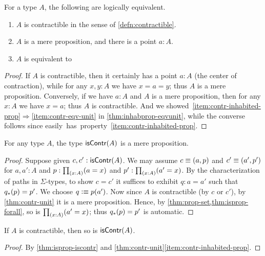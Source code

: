 \begin{lem}\label{thm:contr-unit}
  For a type $A$, the following are logically equivalent.
  \begin{enumerate}
  \item $A$ is contractible in the sense of \autoref{defn:contractible}.\label{item:contr}
  \item $A$ is a mere proposition, and there is a point $a:A$.\label{item:contr-inhabited-prop}
  \item $A$ is equivalent to \unit.\label{item:contr-eqv-unit}
  \end{enumerate}
\end{lem}
\begin{proof}
  If $A$ is contractible, then it certainly has a point $a:A$ (the center of contraction), while for any $x,y:A$ we have $x=a=y$; thus $A$ is a mere proposition.
  Conversely, if we have $a:A$ and $A$ is a mere proposition, then for any $x:A$ we have $x=a$; thus $A$ is contractible.
  And we showed~\ref{item:contr-inhabited-prop}$\Rightarrow$\ref{item:contr-eqv-unit} in \autoref{thm:inhabprop-eqvunit}, while the converse follows since \unit easily has property~\ref{item:contr-inhabited-prop}.
\end{proof}

\begin{lem}\label{thm:isprop-iscontr}
  For any type $A$, the type $\mathsf{isContr}(A)$ is a mere proposition.
\end{lem}
\begin{proof}
  Suppose given $c,c':\mathsf{isContr}(A)$.
  We may assume $c\equiv(a,p)$ and $c'\equiv(a',p')$ for $a,a':A$ and $p:\prd{x:A} (a=x)$ and $p':\prd{x:A} (a'=x)$.
  By the characterization of paths in $\Sigma$-types, to show $c=c'$ it suffices to exhibit $q:a=a'$ such that ${q}_{*}\mathopen{}\left({p}\right)\mathclose{}=p'$.
  We choose $q\vcentcolon\equiv p(a')$.
  Now since $A$ is contractible (by $c$ or $c'$), by \autoref{thm:contr-unit} it is a mere proposition.
  Hence, by \autoref{thm:prop-set,thm:isprop-forall}, so is $\prd{x:A}(a'=x)$; thus ${q}_{*}\mathopen{}\left({p}\right)\mathclose{}=p'$ is automatic.
\end{proof}

\begin{cor}\label{thm:contr-contr}
  If $A$ is contractible, then so is $\mathsf{isContr}(A)$.
\end{cor}
\begin{proof}
  By \autoref{thm:isprop-iscontr} and \autoref{thm:contr-unit}\ref{item:contr-inhabited-prop}.
\end{proof}

